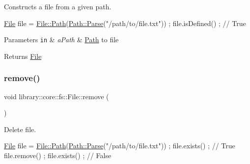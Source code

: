 Constructs a file from a given path. 


\begin{DoxyCode}
\hyperlink{classlibrary_1_1core_1_1fs_1_1_file_a6f3f0d79545ac9984c6f49432f0c6c39}{File} file = \hyperlink{classlibrary_1_1core_1_1fs_1_1_file_a72d6cdf8bb7e299889c6149e2b8a6cc7}{File::Path}(\hyperlink{classlibrary_1_1core_1_1fs_1_1_path_a6ba644b6609507e724c217bf2020f5ae}{Path::Parse}(\textcolor{stringliteral}{"/path/to/file.txt"})) ;
file.isDefined() ; \textcolor{comment}{// True}
\end{DoxyCode}



\begin{DoxyParams}[1]{Parameters}
\mbox{\tt in}  & {\em a\+Path} & \hyperlink{classlibrary_1_1core_1_1fs_1_1_path}{Path} to file \\
\hline
\end{DoxyParams}
\begin{DoxyReturn}{Returns}
\hyperlink{classlibrary_1_1core_1_1fs_1_1_file}{File} 
\end{DoxyReturn}
\mbox{\label{classlibrary_1_1core_1_1fs_1_1_file_a438408d402b994d76d4de3829ec67dbc}} 
\subsubsection{\texorpdfstring{remove()}{remove()}}
{\footnotesize\ttfamily void library\+::core\+::fs\+::\+File\+::remove (\begin{DoxyParamCaption}{ }\end{DoxyParamCaption})}



Delete file. 


\begin{DoxyCode}
\hyperlink{classlibrary_1_1core_1_1fs_1_1_file_a6f3f0d79545ac9984c6f49432f0c6c39}{File} file = \hyperlink{classlibrary_1_1core_1_1fs_1_1_file_a72d6cdf8bb7e299889c6149e2b8a6cc7}{File::Path}(\hyperlink{classlibrary_1_1core_1_1fs_1_1_path_a6ba644b6609507e724c217bf2020f5ae}{Path::Parse}(\textcolor{stringliteral}{"/path/to/file.txt"})) ;
file.exists() ; \textcolor{comment}{// True}
file.remove() ;
file.exists() ; \textcolor{comment}{// False}
\end{DoxyCode}
 \mbox{\label{classlibrary_1_1core_1_1fs_1_1_file_ae65190a612b6958e9e36238e3370c134}} 

